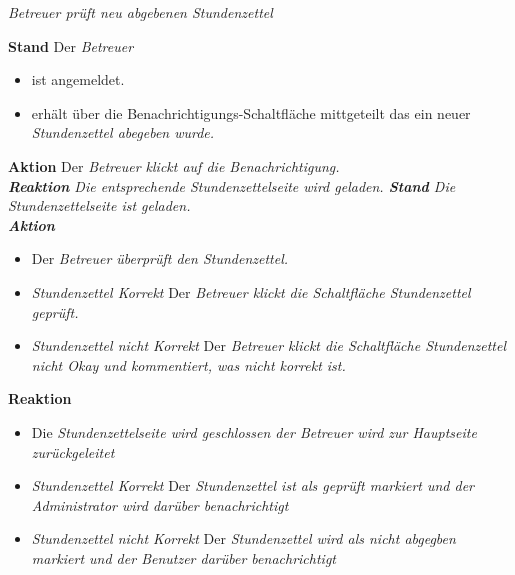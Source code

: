 \begin{requirements}
	 \em{Betreuer} prüft neu \em{abgebenen Stundenzettel}
	\begin{requirements}
	        \textbf{Stand} Der \em{Betreuer}
	            \begin{itemize}
	                \item ist angemeldet.
	                \item erhält über die Benachrichtigungs-Schaltfläche mittgeteilt das ein neuer \em{Stundenzettel} abegeben wurde.
	            \end{itemize}
            \textbf{Aktion} Der \em{Betreuer} klickt auf die Benachrichtigung. \\
            \textbf{Reaktion} Die entsprechende \em{Stundenzettelseite} wird  geladen.
	        \textbf{Stand} Die \em{Stundenzettelseite} ist geladen. \\
            \textbf{Aktion}
                \begin{itemize}
                    \item Der \em{Betreuer} überprüft den \em{Stundenzettel}.
                    \item \textit{Stundenzettel Korrekt} Der \em{Betreuer} klickt die Schaltfläche Stundenzettel geprüft.
                    \item \textit{Stundenzettel nicht Korrekt}  Der \em{Betreuer} klickt die Schaltfläche Stundenzettel nicht Okay und kommentiert, was nicht korrekt ist.
                \end{itemize}
            \textbf{Reaktion}
                \begin{itemize}
                    \item Die \em{Stundenzettelseite} wird geschlossen der \em{Betreuer} wird zur \em{Hauptseite} zurückgeleitet
                    \item \textit{Stundenzettel Korrekt} Der \em{Stundenzettel} ist als \em{geprüft} markiert und der \em{Administrator} wird darüber benachrichtigt
                    \item \textit{Stundenzettel nicht Korrekt} Der \em{Stundenzettel} wird als \em{nicht abgegben} markiert und der \em{Benutzer} darüber benachrichtigt
                \end{itemize}
	\end{requirements}


\end{requirements}
